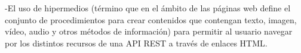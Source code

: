 -El uso de hipermedios (término que en el ámbito de las páginas web define el conjunto de procedimientos para crear contenidos que contengan texto, imagen, vídeo, audio y otros métodos de información) para permitir al usuario navegar por los distintos recursos de una API REST a través de enlaces HTML.



